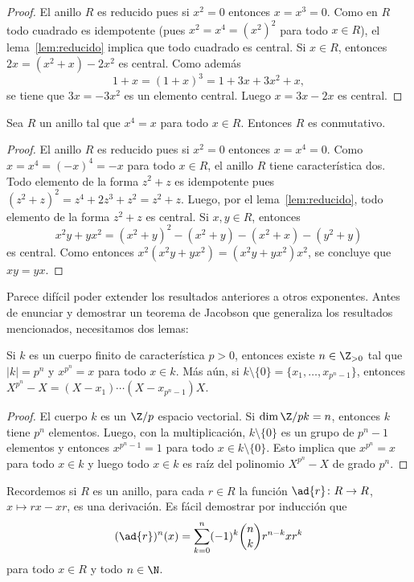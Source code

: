 \begin{proof}
	El anillo $R$ es reducido pues si $x^2=0$ entonces $x=x^3=0$.  Como en $R$
	todo cuadrado es idempotente (pues $x^2=x^4=(x^2)^2$ para todo $x\in R$),
	el lema~\ref{lem:reducido} implica que todo cuadrado es central. 
	Si $x\in R$, entonces 
	$2x=(x^2+x)-2x^2$ 
	es central. Como además 
	\[
		1+x=(1+x)^3=1+3x+3x^2+x,
	\]
	se tiene que $3x=-3x^2$ es un elemento central. Luego $x=3x-2x$ es central.
\end{proof}

\begin{proposition}
	Sea $R$ un anillo tal que $x^4=x$ para todo $x\in R$. Entonces $R$ es conmutativo.
\end{proposition}

\begin{proof}
	El anillo $R$ es reducido pues si $x^2=0$ entonces $x=x^4=0$.  Como
	$x=x^4=(-x)^4=-x$ para todo $x\in R$, el anillo $R$ tiene característica
	dos. Todo elemento de la forma $z^2+z$ es idempotente pues
	$(z^2+z)^2=z^4+2z^3+z^2=z^2+z$. Luego, por el 
	lema~\ref{lem:reducido}, todo elemento de la forma $z^2+z$ es central. Si $x,y\in R$, entonces 
	\[
		x^2y+yx^2=(x^2+y)^2-(x^2+y)-(x^2+x)-(y^2+y)
	\]
	es central. Como entonces $x^2(x^2y+yx^2)=(x^2y+yx^2)x^2$, se concluye que $xy=yx$.
\end{proof}

Parece difícil poder extender los resultados anteriores a otros exponentes. Antes 
de enunciar y demostrar un teorema de Jacobson que generaliza los resultados mencionados, necesitamos
dos lemas:

\begin{lemma}
	\label{lem:k_finito}
	Si $k$ es un cuerpo finito de característica $p>0$, entonces existe
	$n\in\Z_{>0}$ tal que $|k|=p^n$ y $x^{p^n}=x$ para todo $x\in k$. Más aún, si
	$k\setminus\{0\}=\{x_1,\dots,x_{p^n-1}\}$, entonces
	$X^{p^n}-X=(X-x_1)\cdots(X-x_{p^n-1})X$. 
\end{lemma}

\begin{proof}
	El cuerpo $k$ es un $\Z/p$ espacio vectorial. Si $\dim{\Z/p} k=n$, entonces 
	$k$ tiene $p^n$ elementos. Luego, con la multiplicación, $k\setminus\{0\}$ es un grupo de $p^{n}-1$ elementos y entonces 
	$x^{p^n-1}=1$ para todo $x\in k\setminus\{0\}$. Esto implica que $x^{p^n}=x$ para todo $x\in k$ y luego 
	todo $x\in k$ es raíz del polinomio $X^{p^n}-X$ de grado $p^n$. 
\end{proof}

Recordemos si $R$ es un anillo, para cada $r\in R$ la función $\ad{r}\colon
R\to R$, $x\mapsto rx-xr$, es una derivación. Es fácil demostrar por inducción que 
\begin{equation}
	\label{eq:Leibniz}
	(\ad{r})^n(x)=\sum_{k=0}^n(-1)^k\binom{n}{k}r^{n-k}xr^k
\end{equation}
para todo $x\in R$ y todo $n\in\N$. 

